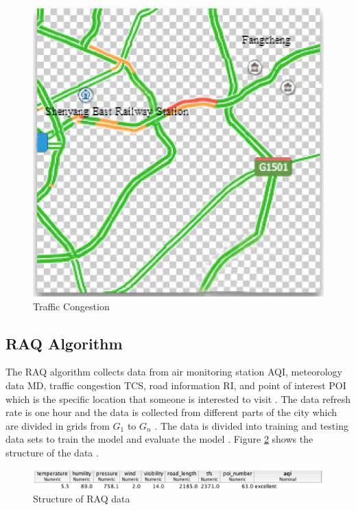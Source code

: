 \documentclass[sigconf]{acmart}
\begin{document}
\begin{figure}
\includegraphics[width=1.0\textwidth]{images/fig3.png}
\caption{Traffic Congestion\cite{raq2016}}
\label{fig:Fig3}
\end{figure}

\subsection{RAQ Algorithm}
The RAQ algorithm collects data from air monitoring station AQI, meteorology data MD, traffic congestion TCS, road information RI, and point of interest POI which is the specific location that someone is interested to visit \cite{raq2016}. The data refresh rate is one hour and the data is collected from different parts of the city which are divided in grids from $G_1$ to $G_n$ \cite{raq2016}. The data is divided into training and testing data sets to train the model and evaluate the model \cite{raq2016}. Figure \ref{fig:Fig4} shows the structure of the data \cite{raq2016}.

\begin{figure}
\includegraphics[width=1.0\textwidth]{images/fig4.png}
\caption{Structure of RAQ data\cite{raq2016}}
\label{fig:Fig4}
\end{figure}
\end{document}
